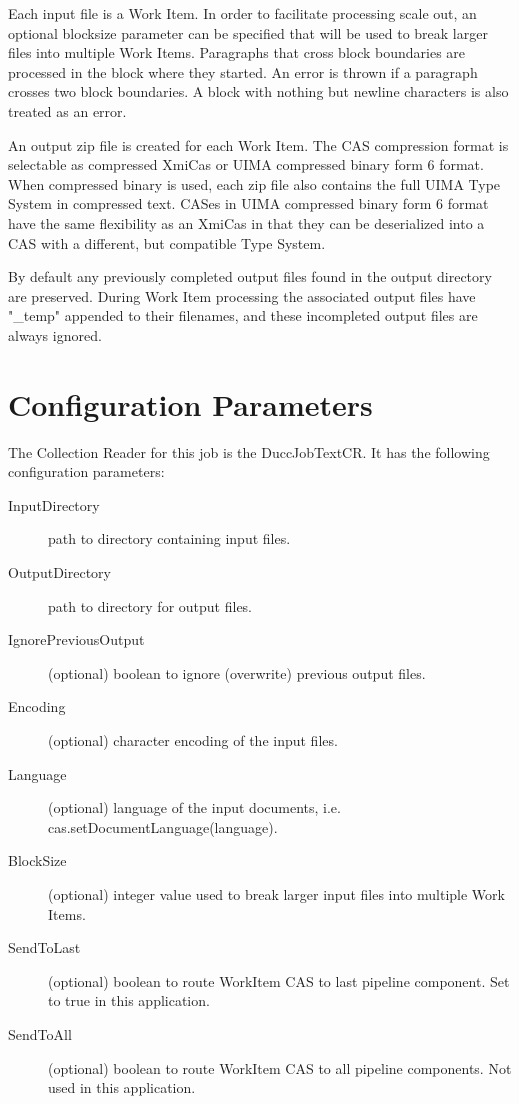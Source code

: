 Each input file is a Work Item. In order to facilitate processing scale out, 
an optional blocksize parameter can be specified that will be used to break larger 
files into multiple Work Items. Paragraphs that cross block boundaries are processed
in the block where they started. An error is thrown if a paragraph crosses two block
boundaries. A block with nothing but newline characters is also treated as an error.

An output zip file is created for each Work Item. The CAS compression format is selectable as
compressed XmiCas or UIMA compressed binary form 6 format. When compressed binary
is used, each zip file also contains the full UIMA Type System in compressed text.
CASes in UIMA compressed binary form 6 format have the same flexibility as an XmiCas in that
they can be deserialized into a CAS with a different, but compatible Type System.

By default any previously completed output files found in the output directory are preserved.
During Work Item processing the associated output files have "\_temp" appended to their
filenames, and these incompleted output files are always ignored.

\section{Configuration Parameters}
The Collection Reader for this job is the DuccJobTextCR. It has the following configuration
parameters:

\begin{description}
    \item[InputDirectory] path to directory containing input files.
    \item[OutputDirectory] path to directory for output files.
    \item[IgnorePreviousOutput] (optional) boolean to ignore (overwrite) previous output files.
    \item[Encoding] (optional) character encoding of the input files.
    \item[Language] (optional) language of the input documents, i.e. cas.setDocumentLanguage(language).
    \item[BlockSize] (optional) integer value used to break larger input files into multiple Work Items.
    \item[SendToLast] (optional) boolean to route WorkItem CAS to last pipeline component. Set to true in this application.
    \item[SendToAll] (optional) boolean to route WorkItem CAS to all pipeline components. Not used in this application.
\end{description}


